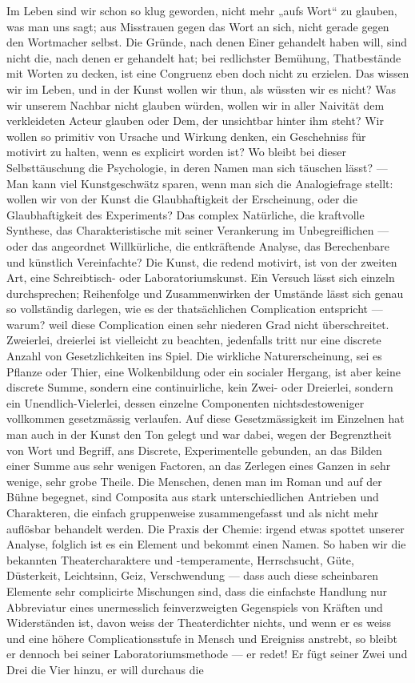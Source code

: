 Im Leben sind wir schon so klug geworden, nicht mehr „aufs Wort“ zu glauben, was man uns sagt; aus Misstrauen gegen das Wort an sich, nicht gerade gegen den Wortmacher selbst. Die Gründe, nach denen Einer gehandelt haben will, sind nicht die, nach denen er gehandelt hat; bei redlichster Bemühung, Thatbestände mit Worten zu decken, ist eine Congruenz eben doch nicht zu erzielen. Das wissen wir im Leben, und in der Kunst wollen wir thun, als wüssten wir es nicht? Was wir unserem Nachbar nicht glauben würden, wollen wir in aller Naivität dem verkleideten Acteur glauben oder Dem, der unsichtbar hinter ihm steht? Wir wollen so primitiv von Ursache und Wirkung denken, ein Geschehniss für motivirt zu halten, wenn es explicirt worden ist? Wo bleibt bei dieser Selbsttäuschung die Psychologie, in deren Namen man sich täuschen lässt? — Man kann viel Kunstgeschwätz sparen, wenn man sich die Analogiefrage stellt: wollen wir von der Kunst die Glaubhaftigkeit der Erscheinung, oder die Glaubhaftigkeit des Experiments? Das complex Natürliche, die kraftvolle Synthese, das Charakteristische mit seiner Verankerung im Unbegreiflichen — oder das angeordnet Willkürliche, die entkräftende Analyse, das Berechenbare und künstlich Vereinfachte? Die Kunst, die redend motivirt, ist von der zweiten Art, eine Schreibtisch- oder Laboratoriumskunst. Ein Versuch lässt sich einzeln durchsprechen; Reihenfolge und Zusammenwirken der Umstände lässt sich genau so vollständig darlegen, wie es der thatsächlichen Complication entspricht — warum? weil diese Complication einen sehr niederen Grad nicht überschreitet. Zweierlei, dreierlei ist vielleicht zu beachten, jedenfalls tritt nur eine discrete Anzahl von Gesetzlichkeiten ins Spiel. Die wirkliche Naturerscheinung, sei es Pflanze oder Thier, eine Wolkenbildung oder ein socialer Hergang, ist aber keine discrete Summe, sondern eine continuirliche, kein Zwei- oder Dreierlei, sondern ein Unendlich-Vielerlei, dessen einzelne Componenten nichtsdestoweniger vollkommen gesetzmässig verlaufen. Auf diese Gesetzmässigkeit im Einzelnen hat man auch in der Kunst den Ton gelegt und war dabei, wegen der Begrenztheit von Wort und Begriff, ans Discrete, Experimentelle gebunden, an das Bilden einer Summe aus sehr wenigen Factoren, an das Zerlegen eines Ganzen in sehr wenige, sehr grobe Theile. Die Menschen, denen man im Roman und auf der Bühne begegnet, sind Composita aus stark unterschiedlichen Antrieben und Charakteren, die einfach gruppenweise zusammengefasst und als nicht mehr auflösbar behandelt werden. Die Praxis der Chemie: irgend etwas spottet unserer Analyse, folglich ist es ein Element und bekommt einen Namen. So haben wir die bekannten Theatercharaktere und -temperamente, Herrschsucht, Güte, Düsterkeit, Leichtsinn, Geiz, Verschwendung — dass auch diese scheinbaren Elemente sehr complicirte Mischungen sind, dass die einfachste Handlung nur Abbreviatur eines unermesslich feinverzweigten Gegenspiels von Kräften und Widerständen ist, davon weiss der Theaterdichter nichts, und wenn er es weiss und eine höhere Complicationsstufe in Mensch und Ereigniss anstrebt, so bleibt er dennoch bei seiner Laboratoriumsmethode — er redet! Er fügt seiner Zwei und Drei die Vier hinzu, er will durchaus die 